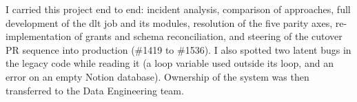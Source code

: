 \begin{contribbox}
I carried this project end to end: incident analysis, comparison of approaches, full development of the dlt job and its modules, resolution of the five parity axes, re-implementation of grants and schema reconciliation, and steering of the cutover PR sequence into production (\#1419 to \#1536). I also spotted two latent bugs in the legacy code while reading it (a loop variable used outside its loop, and an error on an empty Notion database). Ownership of the system was then transferred to the Data Engineering team.
\end{contribbox}
